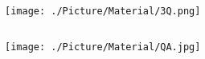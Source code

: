\documentclass[xcolor=table,compress,blue]{beamer}
\begin{document}
\begin{frame}[plain]
	\thispagestyle{empty}
	\begin{columns}
		\begin{column}{\paperwidth}
			\texttt{[image: ./Picture/Material/3Q.png]}
		\end{column}
	\end{columns}
\end{frame}
\begin{frame}[plain]
	\thispagestyle{empty}
	\begin{columns}
		\begin{column}{\paperwidth}
			\texttt{[image: ./Picture/Material/QA.jpg]}
		\end{column}
	\end{columns}
\end{frame}
\end{document}
